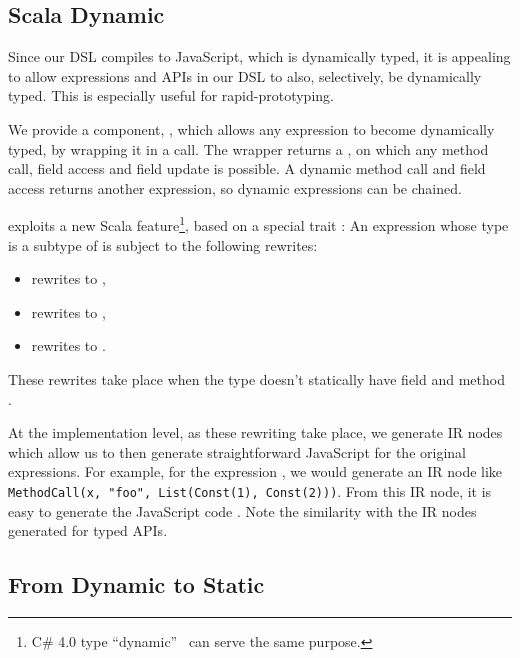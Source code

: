\documentclass[runningheads,a4paper]{llncs}
\begin{document}

\subsection{Scala Dynamic}\label{sec:dynamic}
Since our DSL compiles to JavaScript, which is dynamically typed, it
is appealing to allow expressions and APIs in our DSL to also,
selectively, be dynamically typed. This is especially useful for
rapid-prototyping.

We provide a component, , which allows any expression to become
dynamically typed, by wrapping it in a  call. The
 wrapper returns a , on which any
method call, field access and field update is possible. A dynamic
method call and field access returns another 
expression, so dynamic expressions can be chained.

 exploits a new Scala feature\footnote{C\# 4.0 type ``dynamic''~\cite{csharp-dynamic} can serve the same purpose.}, based on a
special trait : An expression whose type  is a
subtype of  is subject to the following rewrites:
\begin{itemize}
\item {} rewrites to ,
\item {} rewrites to ,
\item {} rewrites to .
\end{itemize}
These rewrites take place when the type  doesn't statically
have field  and method .

At the implementation level, as these rewriting take place, we
generate IR nodes which allow us to then generate straightforward
JavaScript for the original expressions. For example, for the
expression , we would generate an IR node
like {\tt\small MethodCall(x, "foo", List(Const(1), Const(2)))}. From this
IR node, it is easy to generate the JavaScript code . Note the similarity with the IR nodes generated for typed APIs.

\subsection{From Dynamic to Static}\label{sec:dynamic2static}
\end{document}
